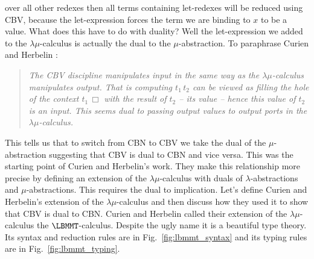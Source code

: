 over all other redexes then all terms containing let-redexes will be
reduced using CBV, because the let-expression forces the term we are
binding to $x$ to be a value.  What does this have to do with duality?
Well the let-expression we added to the $\lambda\mu$-calculus is
actually the dual to the $\mu$-abstraction.  To paraphrase Curien and
Herbelin \cite{Curien:2000}:
\begin{quote}
  \emph{The CBV discipline manipulates input in the same way as the
  $\lambda\mu$-calculus manipulates output.  That is computing
  $t_1\,t_2$ can be viewed as filling the hole of the context
  $t_1\,\Box$ with the result of $t_2$ -- its value -- hence this
  value of $t_2$ is an input.  This seems dual to passing output
  values to output ports in the $\lambda\mu$-calculus.}
\end{quote}
This tells us that to switch from CBN to CBV we take the dual of the
$\mu$-abstraction suggesting that CBV is dual to CBN and vice versa.
This was the starting point of Curien and Herbelin's work.  They make
this relationship more precise by defining an extension of the
$\lambda\mu$-calculus with duals of $\lambda$-abstractions and
$\mu$-abstractions.  This requires the dual to implication.  Let's
define Curien and Herbelin's extension of the $\lambda\mu$-calculus
and then discuss how they used it to show that CBV is dual to CBN.
Curien and Herbelin called their extension of the $\lambda\mu$-calculus
the $\LBMMT$-calculus.  Despite the ugly name it is a beautiful type
theory.  Its syntax and reduction rules are in
Fig.~\ref{fig:lbmmt_syntax} and its typing rules are in Fig.~\ref{fig:lbmmt_typing}.

